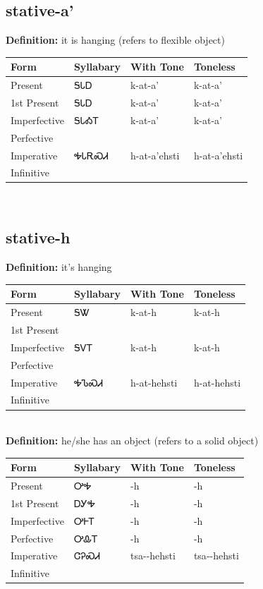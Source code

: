 \documentclass{article}%
\begin{document}
\subsection*{stative-a'}%
\textbf{Definition: }%
it is hanging (refers to flexible object)%
\\[0.5em]%
\begin{tabular}{|l|l|l|l|}%
\hline%
\textbf{Form}&\textbf{Syllabary}&\textbf{With Tone}&\textbf{Toneless}\\%
\hline%
Present&ᎦᏓᎠ&k{-}at{-}a'&k{-}at{-}a'\\%
1st Present&ᎦᏓᎠ&k{-}at{-}a'&k{-}at{-}a'\\%
Imperfective&ᎦᏓᎣᎢ&k{-}at{-}a'&k{-}at{-}a'\\%
Perfective&&&\\%
Imperative&ᎭᏓᎡᏍᏗ&h{-}at{-}a'ehsti&h{-}at{-}a'ehsti\\%
Infinitive&&&\\%
\hline%
\end{tabular}%
\\[1em]%
\subsection*{stative-h}%
\textbf{Definition: }%
it’s hanging%
\\[0.5em]%
\begin{tabular}{|l|l|l|l|}%
\hline%
\textbf{Form}&\textbf{Syllabary}&\textbf{With Tone}&\textbf{Toneless}\\%
\hline%
Present&ᎦᏔ&k{-}at{-}h&k{-}at{-}h\\%
1st Present&&&\\%
Imperfective&ᎦᏙᎢ&k{-}at{-}h&k{-}at{-}h\\%
Perfective&&&\\%
Imperative&ᎭᏖᏍᏗ&h{-}at{-}hehsti&h{-}at{-}hehsti\\%
Infinitive&&&\\%
\hline%
\end{tabular}%
\\[1em]%
\textbf{Definition: }%
he/she has an object (refers to a solid object)%
\\[0.5em]%
\begin{tabular}{|l|l|l|l|}%
\hline%
\textbf{Form}&\textbf{Syllabary}&\textbf{With Tone}&\textbf{Toneless}\\%
\hline%
Present&ᎤᎭ&{-}h&{-}h\\%
1st Present&ᎠᎩᎭ&{-}h&{-}h\\%
Imperfective&ᎤᎰᎢ&{-}h&{-}h\\%
Perfective&ᎤᎲᎢ&{-}h&{-}h\\%
Imperative&ᏣᎮᏍᏗ&tsa{-}{-}hehsti&tsa{-}{-}hehsti\\%
Infinitive&&&\\%
\hline%
\end{tabular}%
\\[1em]%
\end{document}
